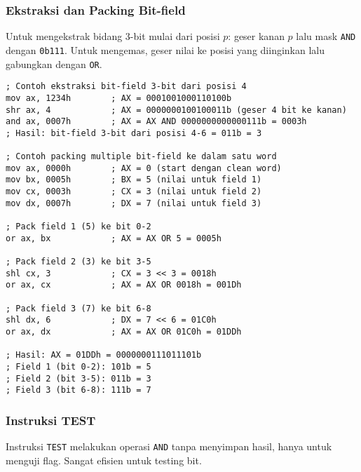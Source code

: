 \documentclass[../main.tex]{subfiles}
\begin{document}
            \subsubsection{Ekstraksi dan Packing Bit-field}
Untuk mengekstrak bidang 3-bit mulai dari posisi \(p\): geser kanan \(p\) lalu mask \texttt{AND} dengan \texttt{0b111}. Untuk mengemas, geser nilai ke posisi yang diinginkan lalu gabungkan dengan \texttt{OR}.

\begin{lstlisting}[language={[x86masm]Assembler}, caption=Ekstraksi dan Packing Bit-field, label={lst:bitfield-examples}]
; Contoh ekstraksi bit-field 3-bit dari posisi 4
mov ax, 1234h        ; AX = 0001001000110100b
shr ax, 4            ; AX = 0000000100100011b (geser 4 bit ke kanan)
and ax, 0007h        ; AX = AX AND 0000000000000111b = 0003h
; Hasil: bit-field 3-bit dari posisi 4-6 = 011b = 3

; Contoh packing multiple bit-field ke dalam satu word
mov ax, 0000h        ; AX = 0 (start dengan clean word)
mov bx, 0005h        ; BX = 5 (nilai untuk field 1)
mov cx, 0003h        ; CX = 3 (nilai untuk field 2)
mov dx, 0007h        ; DX = 7 (nilai untuk field 3)

; Pack field 1 (5) ke bit 0-2
or ax, bx            ; AX = AX OR 5 = 0005h

; Pack field 2 (3) ke bit 3-5
shl cx, 3            ; CX = 3 << 3 = 0018h
or ax, cx            ; AX = AX OR 0018h = 001Dh

; Pack field 3 (7) ke bit 6-8
shl dx, 6            ; DX = 7 << 6 = 01C0h
or ax, dx            ; AX = AX OR 01C0h = 01DDh

; Hasil: AX = 01DDh = 0000000111011101b
; Field 1 (bit 0-2): 101b = 5
; Field 2 (bit 3-5): 011b = 3  
; Field 3 (bit 6-8): 111b = 7
\end{lstlisting}

            \subsubsection{Instruksi TEST}
Instruksi \texttt{TEST} melakukan operasi \texttt{AND} tanpa menyimpan hasil, hanya untuk menguji flag. Sangat efisien untuk testing bit.
\end{document}
